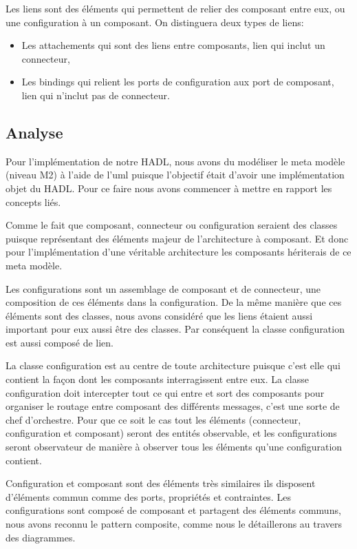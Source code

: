 \documentclass[11pt,a4paper]{article}
\begin{document}
Les liens sont des éléments qui permettent de relier des composant entre eux, ou
une configuration à un composant. On distinguera deux types de liens:
\begin{itemize}
  \item Les attachements qui sont des liens entre composants, lien qui inclut un
connecteur,
  \item Les bindings qui relient les ports de configuration aux port de
  composant, lien qui n'inclut pas de connecteur.
\end{itemize}
 
\subsection{Analyse}

Pour l'implémentation de notre HADL, nous avons du modéliser le meta modèle (niveau M2) à l'aide de l'uml puisque l'objectif était d'avoir une implémentation objet du HADL. Pour ce faire nous avons commencer à mettre en rapport les concepts liés.

Comme le fait que composant, connecteur ou configuration seraient des classes puisque représentant des éléments majeur de l'architecture à composant. Et donc pour l'implémentation d'une véritable architecture les composants hériterais de ce meta modèle.

Les configurations sont un assemblage de composant et de connecteur, une composition de ces éléments dans la configuration. De la même manière que ces éléments sont des classes, nous avons considéré que les liens étaient aussi important pour eux aussi être des classes. Par conséquent la classe configuration est aussi composé de lien.

La classe configuration est au centre de toute architecture puisque c'est elle qui contient la façon dont les composants interragissent entre eux. La classe configuration doit intercepter tout ce qui entre et sort des composants pour organiser le routage entre composant des différents messages, c'est une sorte de chef d'orchestre. Pour que ce soit le cas tout les éléments (connecteur, configuration et composant) seront des entités observable, et les configurations seront observateur de manière à observer tous les éléments qu'une configuration contient.

Configuration et composant sont des éléments très similaires ils disposent d'éléments commun comme des ports, propriétés et contraintes. Les configurations sont composé de composant et partagent des éléments communs, nous avons reconnu le pattern composite, comme nous le détaillerons au travers des diagrammes.
\end{document}
